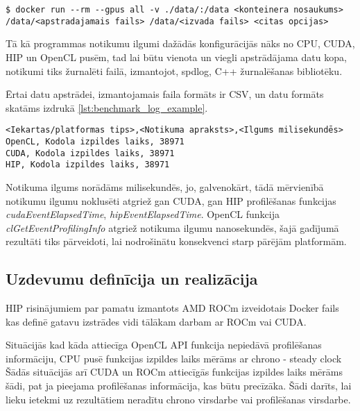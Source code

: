 \documentclass[12pt]{report}%
\theoremstyle{definition}
\begin{document}
\begin{lstlisting}[caption={Docker konteinera palaišana un konfigurācija},
  label=lst:docker_konteinera_palaisanas piemers,
  captionpos=t
]
$ docker run --rm --gpus all -v ./data/:/data <konteinera nosaukums> /data/<apstradajamais fails> /data/<izvada fails> <citas opcijas>
\end{lstlisting}


Tā kā programmas notikumu ilgumi dažādās konfigurācijās nāks no CPU, CUDA, HIP un OpenCL pusēm, tad lai būtu
vienota un viegli apstrādājama datu kopa, notikumi tiks žurnalēti failā, izmantojot, spdlog\cite{spdlog-github}, C++ žurnalēšanas bibliotēku.

Ērtai datu apstrādei, izmantojamais faila formāts ir CSV, un datu formāts skatāms izdrukā \ref{lst:benchmark_log_example}.

\begin{lstlisting}[caption={Etalonuzdevuma žurnālfaila ieraksta formāts},
  label=lst:benchmark_log_example,
  captionpos=t
]
<Iekartas/platformas tips>,<Notikuma apraksts>,<Ilgums milisekundēs>
OpenCL, Kodola izpildes laiks, 38971
CUDA, Kodola izpildes laiks, 38971
HIP, Kodola izpildes laiks, 38971
\end{lstlisting}

Notikuma ilgums norādāms milisekundēs, jo, galvenokārt, tādā mērvienībā
notikumu ilgumu noklusēti atgriež gan CUDA, gan HIP profilēšanas funkcijas
\textit{cudaEventElapsedTime}, \textit{hipEventElapsedTime}. OpenCL funkcija
\textit{clGetEventProfilingInfo} atgriež notikuma ilgumu nanosekundēs, šajā
gadījumā rezultāti tiks pārveidoti, lai nodrošinātu konsekvenci starp pārējām
platformām.


\begin{center}
    \chapter{Uzdevumu definīcija un realizācija}
\end{center}

HIP risinājumiem par pamatu izmantots AMD ROCm izveidotais Docker fails \cite{hip-lib-docker}
kas definē gatavu izstrādes vidi tālākam darbam ar ROCm vai CUDA.



Situācijās kad kāda attiecīga OpenCL API funkcija nepiedāvā profilēšanas informāciju, CPU pusē funkcijas izpildes laiks mērāms ar chrono - steady clock 
Šādās situācijās arī CUDA un ROCm attiecīgās funkcijas izpildes laiks mērāms šādi, pat ja pieejama profilēšanas informācija, kas būtu precīzāka.
Šādi darīts, lai lieku ietekmi uz rezultātiem neradītu chrono virsdarbe vai profilēšanas virsdarbe.
\end{document}
